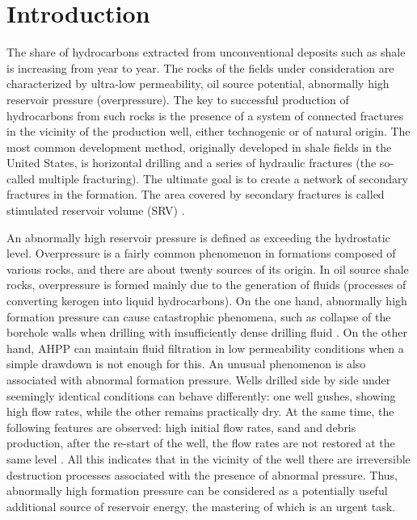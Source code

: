 \documentclass[article,authoryear,jpm]{beg_39}             %
\begin{document}


\maketitle




\section{Introduction}
\label{intro}
The share of hydrocarbons extracted from unconventional deposits such as shale is increasing from year to year. The rocks of the fields under consideration are characterized by ultra-low permeability, oil source potential, abnormally high reservoir pressure (overpressure). The key to successful production of hydrocarbons from such rocks is the presence of a system of connected fractures in the vicinity of the production well, either technogenic or of natural origin. The most common development method, originally developed in shale fields in the United States, is horizontal drilling and a series of hydraulic fractures (the so-called multiple fracturing). The ultimate goal is to create a network of secondary fractures in the formation. The area covered by secondary fractures is called stimulated reservoir volume (SRV) \cite{Warpinski, Wu, Barati, Ma2015}.

An abnormally high reservoir pressure is defined as exceeding the hydrostatic level. Overpressure is a fairly common phenomenon in formations composed of various rocks, and there are about twenty sources of its origin. In oil source shale rocks, overpressure is formed mainly due to the generation of fluids (processes of converting kerogen into liquid hydrocarbons). On the one hand, abnormally high formation pressure can cause catastrophic phenomena, such as collapse of the borehole walls when drilling with insufficiently dense drilling fluid \cite{Ma2015, Li}. On the other hand, AHPP can maintain fluid filtration in low permeability conditions when a simple drawdown is not enough for this. An unusual phenomenon is also associated with abnormal formation pressure. Wells drilled side by side under seemingly identical conditions can behave differently: one well gushes, showing high flow rates, while the other remains practically dry. At the same time, the following features are observed: high initial flow rates, sand and debris production, after the re-start of the well, the flow rates are not restored at the same level \cite{Alekseev}. All this indicates that in the vicinity of the well there are irreversible destruction processes associated with the presence of abnormal pressure. Thus, abnormally high formation pressure can be considered as a potentially useful additional source of reservoir energy, the mastering of which is an urgent task.
\end{document}
